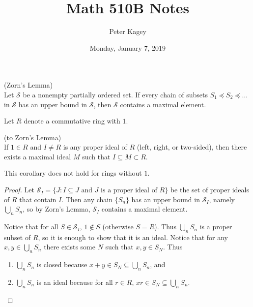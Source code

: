 \documentclass{article}
\newenvironment{definition}[1][Definition.]{
  \begin{trivlist} \item[\hskip \labelsep {\bfseries #1}]
}{\end{trivlist}}
\newenvironment{note}[1][Note.]{
  \begin{trivlist} \item[\hskip \labelsep {\bfseries #1}]
}{\end{trivlist}}
\newenvironment{theorem}[1][Theorem.]{
  \begin{trivlist} \item[\hskip \labelsep {\bfseries #1}]
}{\end{trivlist}}
\newcommand{\set}[1]{\{ #1 \}}
\begin{document}
\title{Math 510B Notes}
\author{Peter Kagey}
\date{Monday, January 7, 2019}
\maketitle

\begin{theorem}[Lemma.] (Zorn's Lemma) \\
  Let $\mathscr S$ be a nonempty partially ordered set. If every chain of
  subsets $S_1 \preceq S_2 \preceq \hdots$ in $\mathscr S$ has an upper bound in
  $\mathscr S$, then $\mathscr S$ contains a maximal element.
\end{theorem}

\begin{definition}[Notation.]
  Let $R$ denote a commutative ring with $1$.
\end{definition}

\begin{theorem}[Corollary.] (to Zorn's Lemma) \\
  If $1 \in R$ and $I \neq R$ is any proper ideal of $R$
  (left, right, or two-sided), then there exists a maximal ideal $M$ such that
  $I \subseteq M \subset R$.
\end{theorem}
\begin{note}
  This corollary does not hold for rings without $1$.
\end{note}
\begin{proof}
  Let $\mathscr S_I = \set{J : I \subseteq J \text{ and } J \text{ is a proper ideal of } R}$
  be the set of proper ideals of $R$ that contain $I$. Then any chain
  $\set{S_n}$ has an upper bound in $\mathscr S_I$, namely $\bigcup_n S_n$, so
  by Zorn's Lemma, $\mathscr S_I$ contains a maximal element.

  Notice that for all $S \in \mathscr S_I$, $1 \not\in S$ (otherwise $S = R$).
  Thus $\bigcup_n S_n$ is a proper subset of $R$, so it is enough to show that
  it is an ideal. Notice that for any $x, y \in \bigcup_n S_n$ there exists some
  $N$ such that $x, y \in S_N$. Thus
  \begin{enumerate}
    \item $\bigcup_n S_n$ is closed because
    $x + y \in S_N \subseteq \bigcup_n S_n$, and
    \item $\bigcup_n S_n$ is an ideal because for all $r \in R$,
    $xr \in S_N \subseteq \bigcup_n S_n$.
  \end{enumerate}
\end{proof}
\end{document}
